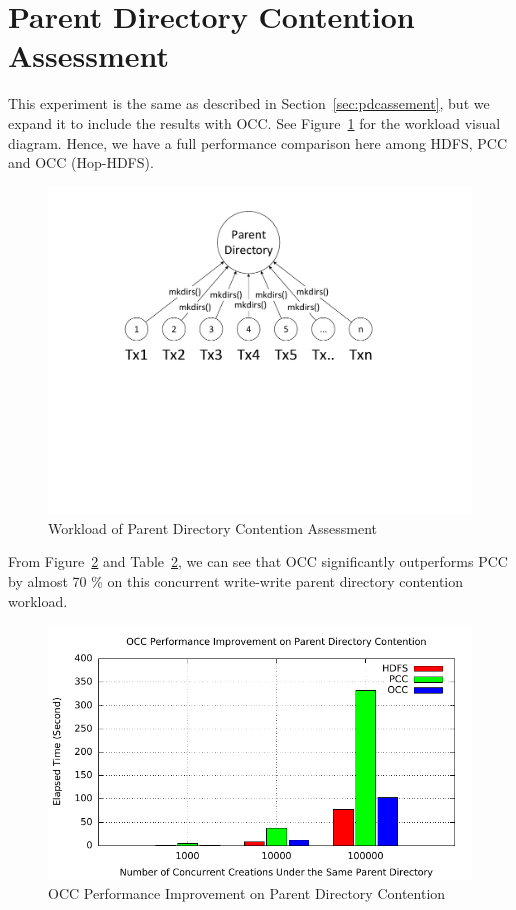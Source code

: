 \section{Parent Directory Contention Assessment}
\label{sec:ww}

This experiment is the same as described in Section~\ref{sec:pdcassement}, but we expand it to include the results with OCC. See Figure~\ref{fig:hdfsPCCOCCparentDiragram} for the workload visual diagram. Hence, we have a full performance comparison here among HDFS, PCC and OCC (Hop-HDFS).

\begin{figure}[ht]
	\centering
	\includegraphics[scale=0.6]{figs/ww.pdf}
	\caption{Workload of Parent Directory Contention Assessment}
	\label{fig:hdfsPCCOCCparentDiragram}
\end{figure}

\noindent From Figure~\ref{fig:hdfsPCCOCCparent} and Table~\ref{fig:hdfsPCCOCCparent}, we can see that OCC significantly outperforms PCC by almost 70 \% on this concurrent write-write parent directory contention workload.

\begin{figure}[ht]
	\centering
	\includegraphics[width=\linewidth]{figs/hdfs_pcc_occ_parent.pdf}
	\caption{OCC Performance Improvement on Parent Directory Contention}
	\label{fig:hdfsPCCOCCparent}
\end{figure}


